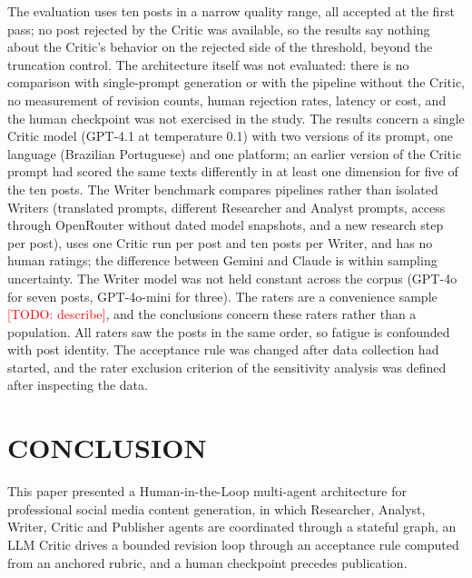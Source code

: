 \documentclass[a4paper,twoside]{article}
\newcommand{\TODO}[1]{\textcolor{red}{[TODO: #1]}}
\begin{document}
The evaluation uses ten posts in a narrow quality range, all accepted at the first pass; no post rejected by the Critic was available, so the results say nothing about the Critic's behavior on the rejected side of the threshold, beyond the truncation control. The architecture itself was not evaluated: there is no comparison with single-prompt generation or with the pipeline without the Critic, no measurement of revision counts, human rejection rates, latency or cost, and the human checkpoint was not exercised in the study. The results concern a single Critic model (GPT-4.1 at temperature 0.1) with two versions of its prompt, one language (Brazilian Portuguese) and one platform; an earlier version of the Critic prompt had scored the same texts differently in at least one dimension for five of the ten posts. The Writer benchmark compares pipelines rather than isolated Writers (translated prompts, different Researcher and Analyst prompts, access through OpenRouter without dated model snapshots, and a new research step per post), uses one Critic run per post and ten posts per Writer, and has no human ratings; the difference between Gemini and Claude is within sampling uncertainty. The Writer model was not held constant across the corpus (GPT-4o for seven posts, GPT-4o-mini for three). The raters are a convenience sample \TODO{describe}, and the conclusions concern these raters rather than a population. All raters saw the posts in the same order, so fatigue is confounded with post identity. The acceptance rule was changed after data collection had started, and the rater exclusion criterion of the sensitivity analysis was defined after inspecting the data.

\section{\uppercase{Conclusion}}
\label{sec:conclusion}

This paper presented a Human-in-the-Loop multi-agent architecture for professional social media content generation, in which Researcher, Analyst, Writer, Critic and Publisher agents are coordinated through a stateful graph, an LLM Critic drives a bounded revision loop through an acceptance rule computed from an anchored rubric, and a human checkpoint precedes publication.
\end{document}

